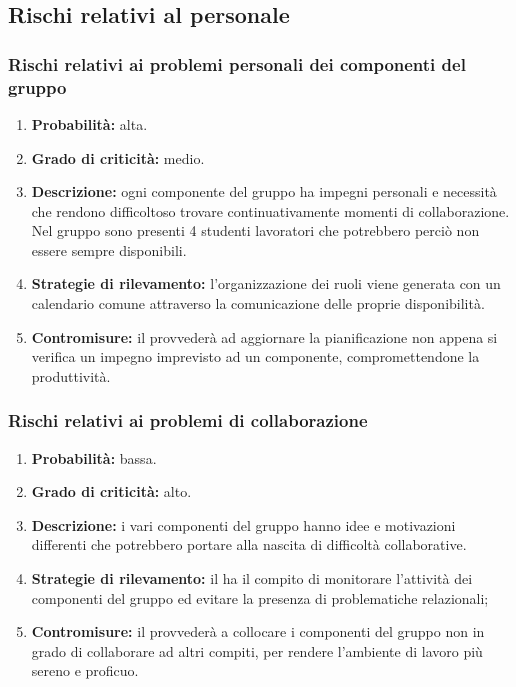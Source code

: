 \subsection{Rischi relativi al personale}
\subsubsection{Rischi relativi ai problemi personali dei componenti del gruppo}
\begin{enumerate}
	\item \textbf{Probabilità:} alta.
	\item \textbf{Grado di criticità:} medio.
	\item \textbf{Descrizione:} ogni componente del gruppo ha impegni personali e necessità che rendono difficoltoso trovare continuativamente momenti di collaborazione. Nel gruppo sono presenti 4 studenti lavoratori che potrebbero perciò non essere sempre disponibili.
	\item \textbf{Strategie di rilevamento:} l’organizzazione dei ruoli viene generata con un calendario comune attraverso la comunicazione delle proprie disponibilità.
	\item \textbf{Contromisure:} il \Responsabile{} provvederà ad aggiornare la pianificazione non appena si verifica un impegno imprevisto ad un componente, compromettendone la produttività.
\end{enumerate}

\subsubsection{Rischi relativi ai problemi di collaborazione}
\begin{enumerate}
	\item \textbf{Probabilità:} bassa.
	\item \textbf{Grado di criticità:} alto.
	\item \textbf{Descrizione:} i vari componenti del gruppo hanno idee e motivazioni differenti che potrebbero portare alla nascita di difficoltà collaborative.
	\item \textbf{Strategie di rilevamento:} il \Responsabile{} ha il compito di monitorare l’attività dei componenti del gruppo ed evitare la presenza di problematiche relazionali;
	\item \textbf{Contromisure:} il \Responsabile{} provvederà a collocare i componenti del gruppo non in grado di collaborare ad altri compiti, per rendere l’ambiente di lavoro più sereno e proficuo.
\end{enumerate}

